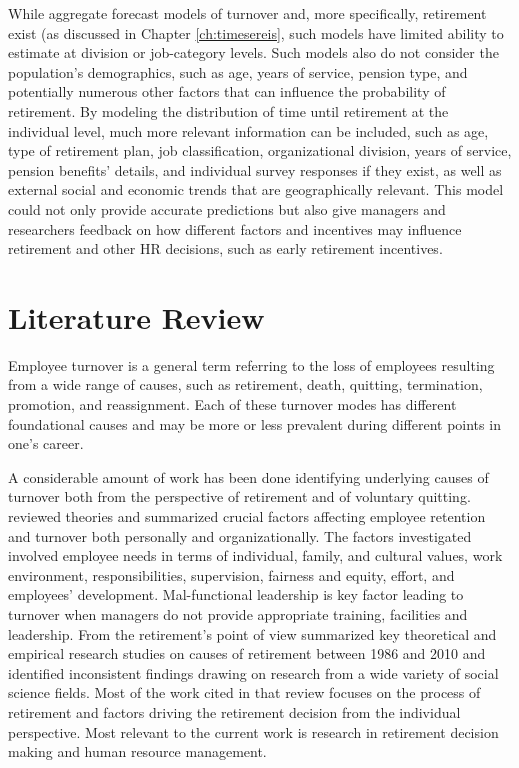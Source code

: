 While aggregate forecast models of turnover and, more specifically, retirement exist (as discussed in Chapter \ref{ch:timesereis}, such models have limited ability to estimate at division or job-category levels. Such models also do not consider the population's demographics, such as age, years of service, pension type, and potentially numerous other factors that can influence the probability of retirement. By  modeling  the  distribution  of time until retirement at the individual level, much more relevant information can be included, such as age, type of retirement plan,  job classification, organizational division, years of service, pension benefits' details, and individual survey responses if they exist, as well as external social and economic trends that are geographically relevant. This model could not only provide accurate predictions but also give managers and researchers feedback on how different factors and incentives may influence retirement and other HR decisions, such as early retirement incentives.

\section{Literature Review}

Employee turnover is a general term referring to the loss of employees resulting from a wide range of causes, such as retirement, death, quitting, termination, promotion, and reassignment.  Each of these turnover modes has different foundational causes and may be more or less prevalent during different points in one's career.

A considerable amount of work has been done identifying underlying causes of turnover both from the perspective of retirement and of voluntary quitting. \citet{rainlall2004} reviewed theories and summarized crucial factors affecting employee retention and turnover both personally and organizationally.  The factors investigated involved employee needs in terms of individual, family, and cultural values, work environment, responsibilities, supervision, fairness and equity, effort, and employees' development.  Mal-functional leadership is key factor leading to turnover when managers do not provide appropriate training, facilities and leadership. From the retirement's point of view  \citet{Wang2010} summarized key theoretical and empirical research studies on causes of retirement between 1986 and 2010 and identified inconsistent findings drawing on research from a wide variety of social science fields. Most of the work cited in that review focuses on the process of retirement and factors driving the retirement decision from the individual perspective. Most relevant to the current work is research in retirement decision making and human resource management.

